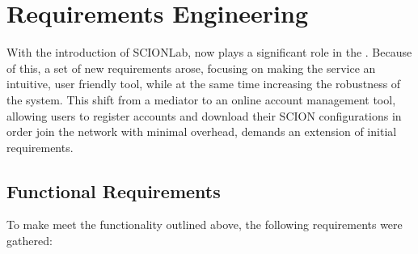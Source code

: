 \chapter{Requirements Engineering}
\label{req}


With the introduction of SCIONLab, \lcs now plays a significant role in the \lee. Because of this, a set of new requirements arose, focusing on making the service an intuitive, user friendly tool, while at the same time increasing the robustness of the system. This shift from a mediator to an online account management tool, allowing users to register accounts and download their SCION configurations in order join the network with minimal overhead, demands an extension of initial requirements.

\section{Functional Requirements}
\label{func_req}

To make \lcs meet the functionality outlined above, the following requirements were gathered:

